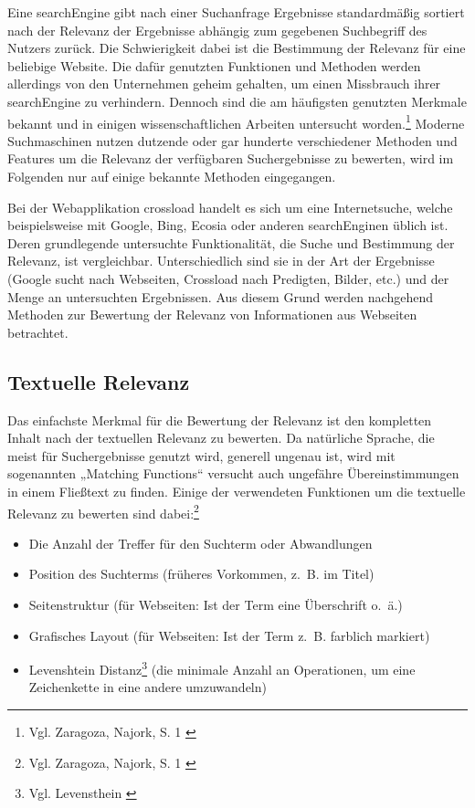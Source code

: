 Eine \gls{searchEngine} gibt nach einer Suchanfrage Ergebnisse standardmäßig sortiert nach der Relevanz der Ergebnisse abhängig zum gegebenen Suchbegriff des Nutzers zurück.
Die Schwierigkeit dabei ist die Bestimmung der Relevanz für eine beliebige Website.
Die dafür genutzten Funktionen und Methoden werden allerdings von den Unternehmen geheim gehalten, um einen Missbrauch ihrer \gls{searchEngine} zu verhindern.
Dennoch sind die am häufigsten genutzten Merkmale bekannt und in einigen wissenschaftlichen Arbeiten untersucht worden.\footnote{Vgl. Zaragoza, Najork, S. 1 \cite{zaragoza2018}}
Moderne Suchmaschinen nutzen dutzende oder gar hunderte verschiedener Methoden und Features um die Relevanz der verfügbaren Suchergebnisse zu bewerten, wird im Folgenden nur auf einige bekannte Methoden eingegangen.

Bei der Webapplikation \gls{crossload} handelt es sich um eine Internetsuche, welche beispielsweise mit Google, Bing, Ecosia oder anderen \gls{searchEngine}n üblich ist.
Deren grundlegende untersuchte Funktionalität, die Suche und Bestimmung der Relevanz, ist vergleichbar.
Unterschiedlich sind sie in der Art der Ergebnisse (Google sucht nach Webseiten, Crossload nach Predigten, Bilder, etc.) und der Menge an untersuchten Ergebnissen.
Aus diesem Grund werden nachgehend Methoden zur Bewertung der Relevanz von Informationen aus Webseiten betrachtet.

\subsection{Textuelle Relevanz}
\label{sub:relevanceText}
Das einfachste Merkmal für die Bewertung der Relevanz ist den kompletten Inhalt nach der textuellen Relevanz zu bewerten.
Da natürliche Sprache, die meist für Suchergebnisse genutzt wird, generell ungenau ist, wird mit sogenannten „Matching Functions“ versucht auch ungefähre Übereinstimmungen in einem Fließtext zu finden.
Einige der verwendeten Funktionen um die textuelle Relevanz zu bewerten sind dabei:\footnote{Vgl. Zaragoza, Najork, S. 1 \cite{zaragoza2018}}

\begin{itemize}
  \item Die Anzahl der Treffer für den Suchterm oder Abwandlungen
  \item Position des Suchterms (früheres Vorkommen, z. B. im Titel)
  \item Seitenstruktur (für Webseiten: Ist der Term eine Überschrift o. ä.)
  \item Grafisches Layout (für Webseiten: Ist der Term z. B. farblich markiert)
  \item Levenshtein Distanz\footnote{Vgl. Levensthein \cite{levenshtein1966binary}} (die minimale Anzahl an Operationen, um eine Zeichenkette in eine andere umzuwandeln)
\end{itemize}

